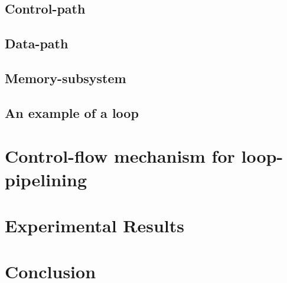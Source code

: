 \documentclass[conference]{IEEEtran}
\begin{document}

\subsection{Control-path}


\subsection{Data-path}


\subsection{Memory-subsystem}


\subsection{An example of a loop}


\section{Control-flow mechanism for loop-pipelining}


\section{Experimental Results}


\section{Conclusion}




\end{document}
